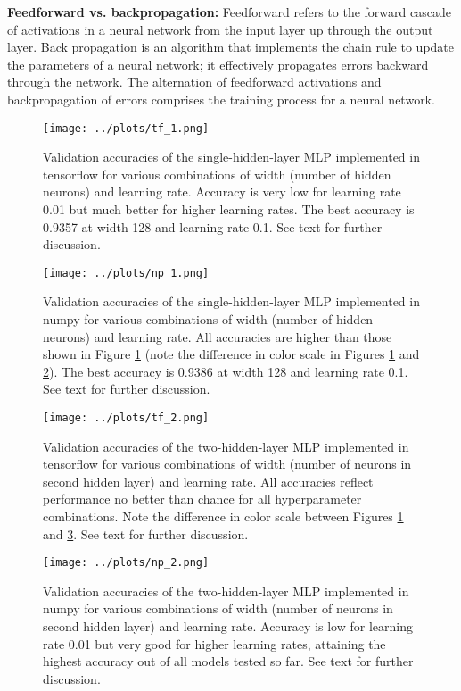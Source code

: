 \documentclass[11pt]{article}
\begin{document}
\textbf{Feedforward vs. backpropagation: } Feedforward refers to the forward cascade of activations in a neural network from the input layer up through the output layer. Back propagation is an algorithm that implements the chain rule to update the parameters of a neural network; it effectively propagates errors backward through the network. The alternation of feedforward activations and backpropagation of errors comprises the training process for a neural network.

\newpage

\begin{figure}[h!]
\centering
\texttt{[image: ../plots/tf\_1.png]}
\caption{\label{tf-1} Validation accuracies of the single-hidden-layer MLP implemented in tensorflow for various combinations of width (number of hidden neurons) and learning rate. Accuracy is very low for learning rate 0.01 but much better for higher learning rates. The best accuracy is 0.9357 at width 128 and learning rate 0.1. See text for further discussion.}
\end{figure}

\begin{figure}[h!]
\centering
\texttt{[image: ../plots/np\_1.png]}
\caption{\label{np-1} Validation accuracies of the single-hidden-layer MLP implemented in numpy for various combinations of width (number of hidden neurons) and learning rate. All accuracies are higher than those shown in Figure \ref{tf-1} (note the difference in color scale in Figures \ref{tf-1} and \ref{np-1}). The best accuracy is 0.9386 at width 128 and learning rate 0.1. See text for further discussion.}
\end{figure}

\newpage

\begin{figure}[h!]
\centering
\texttt{[image: ../plots/tf\_2.png]}
\caption{\label{tf-2} Validation accuracies of the two-hidden-layer MLP implemented in tensorflow for various combinations of width (number of neurons in second hidden layer) and learning rate. All accuracies reflect performance no better than chance for all hyperparameter combinations. Note the difference in color scale between Figures \ref{tf-1} and \ref{tf-2}. See text for further discussion.}
\end{figure}

\begin{figure}[h!]
\centering
\texttt{[image: ../plots/np\_2.png]}
\caption{\label{np-2} Validation accuracies of the two-hidden-layer MLP implemented in numpy for various combinations of width (number of neurons in second hidden layer) and learning rate. Accuracy is low for learning rate 0.01 but very good for higher learning rates, attaining the highest accuracy out of all models tested so far. See text for further discussion.}
\end{figure}
\end{document}
